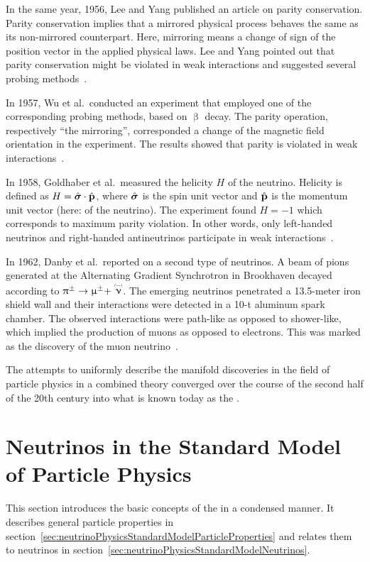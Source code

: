 In the same year, 1956, Lee and Yang published an article on parity conservation. Parity conservation implies that a mirrored physical process behaves the same as its non-mirrored counterpart. Here, mirroring means a change of sign of the position vector in the applied physical laws. Lee and Yang pointed out that parity conservation might be violated in weak interactions and suggested several probing methods~\cite{Lee1956}. 

In 1957, Wu et al.~conducted an experiment that employed one of the corresponding probing methods, based on $\upbeta$ decay. The parity operation, respectively ``the mirroring'', corresponded a change of the magnetic field orientation in the experiment. The results showed that parity is violated in weak interactions~\cite{Wu1957}. 

In 1958, Goldhaber et al.~measured the helicity $H$ of the neutrino. Helicity is defined as $ H = \hat{\boldsymbol{\mathbf{\sigma}}} \cdot \hat{\boldsymbol{\mathbf{p}}}$, where $\hat{\boldsymbol{\mathbf{\sigma}}}$ is the spin unit vector and $\hat{\boldsymbol{\mathbf{p}}}$ is the momentum unit vector (here: of the neutrino). The experiment found $H = -1$ which corresponds to maximum parity violation. In other words, only left-handed neutrinos and right-handed antineutrinos participate in weak interactions~\cite{Goldhaber1958}.

In 1962, Danby et al.~reported on a second type of neutrinos. A beam of pions generated at the Alternating Gradient Synchrotron in Brookhaven decayed according to $\uppi^{\pm} \rightarrow \upmu^{\pm} + \maybeaneutrino$. The emerging neutrinos penetrated a 13.5-meter iron shield wall and their interactions were detected in a 10-t aluminum spark chamber. The observed interactions were path-like as opposed to shower-like, which implied the production of muons as opposed to electrons. This was marked as the discovery of the muon neutrino~\cite{Danby1962}.

The attempts to uniformly describe the manifold discoveries in the field of particle physics in a combined theory converged over the course of the second half of the 20th century into what is known today as the .
    
\section{Neutrinos in the Standard Model of Particle Physics}
\label{sec:neutrinoPhysicsStandardModel}
This section introduces the basic concepts of the  in a condensed manner. It describes general particle properties in section~\ref{sec:neutrinoPhysicsStandardModelParticleProperties} and relates them to neutrinos in section~\ref{sec:neutrinoPhysicsStandardModelNeutrinos}.

